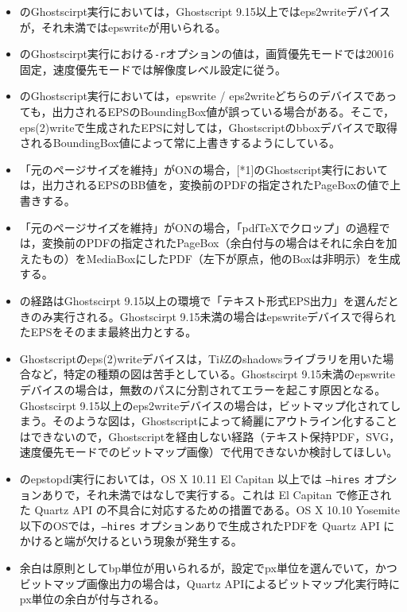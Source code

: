 \documentclass[uplatex,dvipdfmx,landscape]{jsarticle}
\newcommand*\TikZ{Ti\textit{k}Z}
\begin{document}
{\baselineskip18pt
\begin{itemize}[leftmargin=2zw]
\item\relax[*1]のGhostscirpt実行においては，Ghostscript 9.15以上ではeps2writeデバイスが，それ未満ではepswriteが用いられる。
\item\relax[*1]のGhostscirpt実行における\texttt{-r}オプションの値は，画質優先モードでは20016固定，速度優先モードでは解像度レベル設定に従う。
\item\relax[*1]のGhostscript実行においては，epswrite / eps2writeどちらのデバイスであっても，出力されるEPSのBoundingBox値が誤っている場合がある。そこで，eps(2)writeで生成されたEPSに対しては，Ghostscriptのbboxデバイスで取得されるBoundingBox値によって常に上書きするようにしている。
\item 「元のページサイズを維持」がONの場合，[*1]のGhostscript実行においては，出力されるEPSのBB値を，変換前のPDFの指定されたPageBoxの値で上書きする。
\item 「元のページサイズを維持」がONの場合，「pdf\TeX でクロップ」の過程では，変換前のPDFの指定されたPageBox（余白付与の場合はそれに余白を加えたもの）をMediaBoxにしたPDF（左下が原点，他のBoxは非明示）を生成する。
\item\relax[*2]の経路はGhostscirpt 9.15以上の環境で「テキスト形式EPS出力」を選んだときのみ実行される。Ghostscirpt 9.15未満の場合はepswriteデバイスで得られたEPSをそのまま最終出力とする。
\item Ghostscriptのeps(2)writeデバイスは，\TikZ のshadowsライブラリを用いた場合など，特定の種類の図は苦手としている。Ghostscirpt 9.15未満のepswriteデバイスの場合は，無数のパスに分割されてエラーを起こす原因となる。Ghostscirpt 9.15以上のeps2writeデバイスの場合は，ビットマップ化されてしまう。そのような図は，Ghostscriptによって綺麗にアウトライン化することはできないので，Ghostscriptを経由しない経路（テキスト保持PDF，SVG，速度優先モードでのビットマップ画像）で代用できないか検討してほしい。
\item\relax[*3]のepstopdf実行においては，OS X 10.11 El Capitan 以上では \texttt{--hires} オプションありで，それ未満ではなしで実行する。これは El Capitan で修正された Quartz API の不具合に対応するための措置である。OS X 10.10 Yosemite 以下のOSでは，\texttt{--hires} オプションありで生成されたPDFを Quartz API にかけると端が欠けるという現象が発生する。
\item 余白は原則としてbp単位が用いられるが，設定でpx単位を選んでいて，かつビットマップ画像出力の場合は，Quartz APIによるビットマップ化実行時にpx単位の余白が付与される。
\end{itemize}
}
\end{document}
